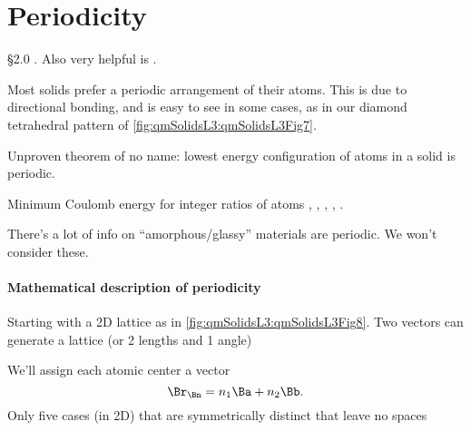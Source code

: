 %
%
%
\section{Periodicity}

\reading \S 2.0 \citep{ibach2009solid}.  Also very helpful is \citep{tung:bravais}.

Most solids prefer a periodic arrangement of their atoms.  This is due to directional bonding, and is easy to see in some cases, as in our diamond tetrahedral pattern of \cref{fig:qmSolidsL3:qmSolidsL3Fig7}.
%

Unproven theorem of no name: lowest energy configuration of atoms in a solid is periodic.

Minimum Coulomb energy for integer ratios of atoms
,
,
,
,
.

There's a lot of info on ``amorphous/glassy'' materials are  periodic.  We won't consider these.
%
\paragraph{Mathematical description of periodicity}

Starting with a 2D lattice as in \cref{fig:qmSolidsL3:qmSolidsL3Fig8}.  Two vectors can generate a lattice (or 2 lengths and 1 angle)
%

We'll assign each atomic center a vector
%
\begin{dmath}\label{eqn:condensedMatterLecture3:100}
\Br_\Bn = n_1 \Ba + n_2 \Bb.
\end{dmath}
%
Only five cases (in 2D) that are symmetrically distinct that leave no spaces


